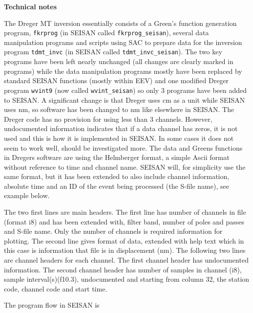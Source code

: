\textbf{Technical notes}

The Dreger MT inversion essentially consists of a Green's function generation program, \texttt{fkrprog} (in SEISAN called \texttt{fkrprog\_seisan}), several data manipulation programs and scripts using SAC to prepare data for the inversion program \texttt{tdmt\_invc} (in SEISAN called \texttt{tdmt\_invc\_seisan}).  The two key programs have been left nearly unchanged (all changes are clearly marked in programs) while the data manipulation programs mostly have been replaced by standard SEISAN functions (mostly within EEV) and one modified Dreger program \texttt{wvint9} (now called \texttt{wvint\_seisan}) so only 3 programs have been added to SEISAN. A significant change is that Dreger uses cm as a unit while SEISAN uses nm, so software has been changed to nm like elsewhere in SEISAN. 
The Dreger code has no provision for  using less than 3 channels. However, undocumented information indicates that if a data channel has zeros, it is not used and this is how it is implemented in SEISAN. In some cases it does not seem to work well, should be investigated more.
The data and Greens functions in Dregers software are using the Helmberger format, a simple Ascii format without reference to time and channel name. SEISAN will, for simplicity use the same format, but it has been extended to also include channel information, absolute time and an ID of the event being processed (the S-file name), see example below. 



The two first lines are main headers. The first line has number of channels in file (format i8) and has been extended with, filter band, number of poles and passes and S-file name. Only the number of channels is required information for plotting. The second line gives format of data, extended with help text which in this case is information that file is in displacement (nm). The following two lines are channel headers for each channel. The first channel header has undocumented information. The second channel header has number of samples in channel (i8), sample interval(s)(f10.3), undocumented and starting from column 32, the station code, channel code and start time.

The program flow in SEISAN is

